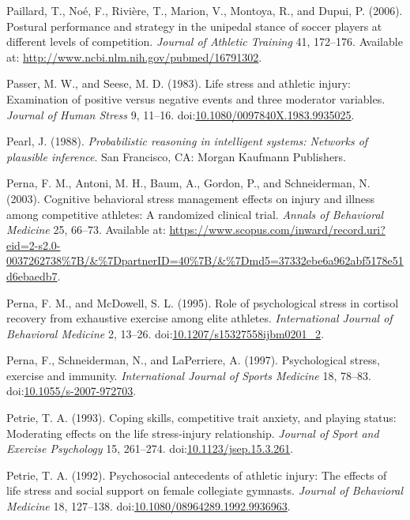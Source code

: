 \documentclass[
]{frontiersHLTH}
\newlength{\cslhangindent}
\newenvironment{cslreferences}%
  {\setlength{\parindent}{0pt}%
  \everypar{\setlength{\hangindent}{\cslhangindent}}\ignorespaces}%
  {\par}
\begin{document}
\begin{cslreferences}
\leavevmode\hypertarget{ref-Paillard2006}{}%
Paillard, T., Noé, F., Rivière, T., Marion, V., Montoya, R., and Dupui,
P. (2006). Postural performance and strategy in the unipedal stance of
soccer players at different levels of competition. \emph{Journal of
Athletic Training} 41, 172--176. Available at:
\url{http://www.ncbi.nlm.nih.gov/pubmed/16791302}.

\leavevmode\hypertarget{ref-Passer1983a}{}%
Passer, M. W., and Seese, M. D. (1983). Life stress and athletic injury:
Examination of positive versus negative events and three moderator
variables. \emph{Journal of Human Stress} 9, 11--16.
doi:\href{https://doi.org/10.1080/0097840X.1983.9935025}{10.1080/0097840X.1983.9935025}.

\leavevmode\hypertarget{ref-Pearl1988}{}%
Pearl, J. (1988). \emph{Probabilistic reasoning in intelligent systems:
Networks of plausible inference}. San Francisco, CA: Morgan Kaufmann
Publishers.

\leavevmode\hypertarget{ref-Perna2003}{}%
Perna, F. M., Antoni, M. H., Baum, A., Gordon, P., and Schneiderman, N.
(2003). Cognitive behavioral stress management effects on injury and
illness among competitive athletes: A randomized clinical trial.
\emph{Annals of Behavioral Medicine} 25, 66--73. Available at:
\url{https://www.scopus.com/inward/record.uri?eid=2-s2.0-0037262738\%7B/\&\%7DpartnerID=40\%7B/\&\%7Dmd5=37332ebe6a962abf5178e51d6ebaedb7}.

\leavevmode\hypertarget{ref-Perna1995}{}%
Perna, F. M., and McDowell, S. L. (1995). Role of psychological stress
in cortisol recovery from exhaustive exercise among elite athletes.
\emph{International Journal of Behavioral Medicine} 2, 13--26.
doi:\href{https://doi.org/10.1207/s15327558ijbm0201_2}{10.1207/s15327558ijbm0201\_2}.

\leavevmode\hypertarget{ref-Perna1997}{}%
Perna, F., Schneiderman, N., and LaPerriere, A. (1997). Psychological
stress, exercise and immunity. \emph{International Journal of Sports
Medicine} 18, 78--83.
doi:\href{https://doi.org/10.1055/s-2007-972703}{10.1055/s-2007-972703}.

\leavevmode\hypertarget{ref-Petrie1993}{}%
Petrie, T. A. (1993). Coping skills, competitive trait anxiety, and
playing status: Moderating effects on the life stress-injury
relationship. \emph{Journal of Sport and Exercise Psychology} 15,
261--274.
doi:\href{https://doi.org/10.1123/jsep.15.3.261}{10.1123/jsep.15.3.261}.

\leavevmode\hypertarget{ref-Petrie1992}{}%
Petrie, T. A. (1992). Psychosocial antecedents of athletic injury: The
effects of life stress and social support on female collegiate gymnasts.
\emph{Journal of Behavioral Medicine} 18, 127--138.
doi:\href{https://doi.org/10.1080/08964289.1992.9936963}{10.1080/08964289.1992.9936963}.


\end{cslreferences}
\end{document}
